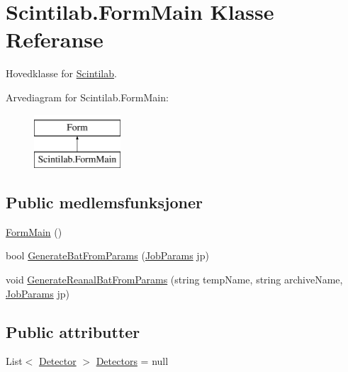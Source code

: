 \hypertarget{class_scintilab_1_1_form_main}{\section{Scintilab.\+Form\+Main Klasse Referanse}
\label{class_scintilab_1_1_form_main}
}


Hovedklasse for \hyperlink{namespace_scintilab}{Scintilab}.  


Arvediagram for Scintilab.\+Form\+Main\+:\begin{figure}[H]
\begin{center}
\leavevmode
\includegraphics[height=2.000000cm]{class_scintilab_1_1_form_main}
\end{center}
\end{figure}
\subsection*{Public medlemsfunksjoner}
\begin{DoxyCompactItemize}
\item 
\hyperlink{class_scintilab_1_1_form_main_a7f176c8b5bf31282b730dbfd05155642}{Form\+Main} ()
\item 
bool \hyperlink{class_scintilab_1_1_form_main_ac34ad4400cb8a7b5d38feca1f620b3cb}{Generate\+Bat\+From\+Params} (\hyperlink{class_scintilab_1_1_job_params}{Job\+Params} jp)
\item 
void \hyperlink{class_scintilab_1_1_form_main_ab1eef461219a3b724d3bf3af0cd68e94}{Generate\+Reanal\+Bat\+From\+Params} (string temp\+Name, string archive\+Name, \hyperlink{class_scintilab_1_1_job_params}{Job\+Params} jp)
\end{DoxyCompactItemize}
\subsection*{Public attributter}
\begin{DoxyCompactItemize}
\item 
List$<$ \hyperlink{class_scintilab_1_1_detector}{Detector} $>$ \hyperlink{class_scintilab_1_1_form_main_a88f16134102d9e4c5630adf5ff97f090}{Detectors} = null
\end{DoxyCompactItemize}
